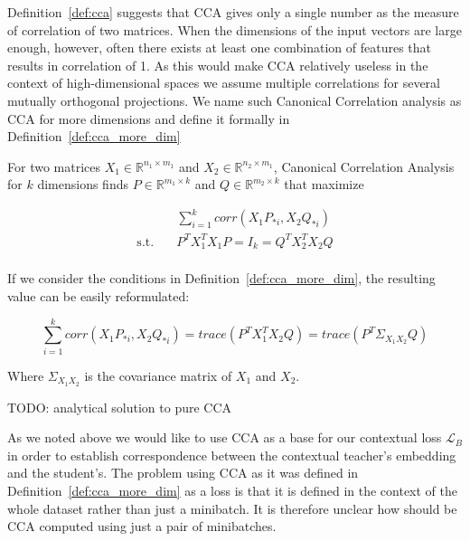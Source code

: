 Definition~\ref{def:cca} suggests that CCA gives only a single number as the
measure of correlation of two matrices. When the dimensions of the input vectors
are large enough, however, often there exists at least one combination of
features that results in correlation of 1. As this would make CCA relatively
useless in the context of high-dimensional spaces we assume multiple
correlations for several mutually orthogonal projections. We name such Canonical
Correlation analysis as CCA for more dimensions and define it formally in
Definition~\ref{def:cca_more_dim}

\begin{defn}\label{def:cca_more_dim}

  For two matrices $X_1 \in \mathbb{R}^{n_1 \times m_1}$ and $X_2 \in
  \mathbb{R}^{n_2 \times m_1}$, Canonical Correlation Analysis for $k$
  dimensions finds $P \in \mathbb{R}^{m_1 \times k}$ and $Q \in \mathbb{R}^{m_2
  \times k}$ that maximize

  \begin{equation}
    \begin{split}
      &\sum_{i = 1}^k corr(X_1P_{*i}, X_2Q_{*i}) \\
      \text{s.t.}\quad &P^TX_1^TX_1P = I_k = Q^TX_2^TX_2Q \\
    \end{split}
  \end{equation}


\end{defn}

If we consider the conditions in Definition~\ref{def:cca_more_dim}, the
resulting value can be easily reformulated:

\begin{equation}
    \sum_{i = 1}^k corr(X_1P_{*i}, X_2Q_{*i}) =
    trace(P^TX_1^TX_2Q) =
    trace(P^T\Sigma_{X_1X_2}Q)
\end{equation}

Where $\Sigma_{X_1X_2}$ is the covariance matrix of $X_1$ and $X_2$.

TODO: analytical solution to pure CCA

As we noted above we would like to use CCA as a base for our contextual loss
$\mathcal{L}_B$ in order to establish correspondence between the contextual
teacher's embedding and the student's. The problem using CCA as it was defined
in Definition~\ref{def:cca_more_dim} as a loss is that it is defined in the
context of the whole dataset rather than just a minibatch. It is therefore
unclear how should be CCA computed using just a pair of minibatches.

